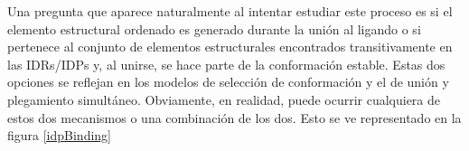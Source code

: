 Una pregunta que aparece naturalmente al intentar estudiar este proceso es si el elemento estructural ordenado es generado durante la unión al ligando 
o si pertenece al conjunto de elementos estructurales encontrados transitivamente en las IDRs/IDPs y, al unirse, se hace parte de la conformación estable.
Estas dos opciones se reflejan en los modelos de selección de conformación y el de unión y plegamiento simultáneo.
% 
Obviamente, en realidad, puede ocurrir cualquiera de estos dos mecanismos o una combinación de los dos.
Esto se ve representado en la figura \ref{idpBinding}


